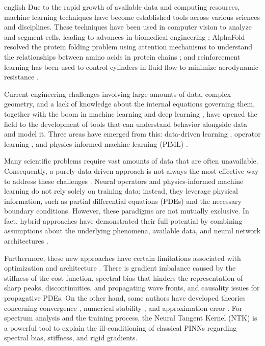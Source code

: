 \documentclass[0000.tex]{subfiles}
\begin{document}
\begin{hyphenrules}{english}
Due to the rapid growth of available data and computing resources, machine learning techniques have
become established tools across various sciences and disciplines. These techniques have been used in
computer vision to analyze and segment cells, leading to advances in biomedical engineering
\cite{ronneberger2015}; AlphaFold resolved the protein folding problem using attention mechanisms
to understand the relationships between amino acids in protein chains \cite{jumper2021}; and
reinforcement learning has been used to control cylinders in fluid flow to minimize aerodynamic
resistance \cite{rabault2019}.

Current engineering challenges involving large amounts of data, complex geometry, and a lack of
knowledge about the internal equations governing them, together with the boom in machine learning and
deep learning \cite{bishop2006,goodfellow2016,bach2024}, have opened the field to the development
of tools that can understand behavior alongside data and model it. Three areas have emerged from this:
data-driven learning \cite{fiorini2025,brunton2016,chen2018}, operator learning
\cite{kovachki2021,li2021fno}, and physics-informed machine learning (PIML)
\cite{raissi2019,cuomo2022}.

Many scientific problems require vast amounts of data that are often unavailable. Consequently, a
purely data-driven approach is not always the most effective way to address these challenges
\cite{wu2020}. Neural operators and physics-informed machine learning do not rely solely on
training data; instead, they leverage physical information, such as partial differential equations
(PDEs) and the necessary boundary conditions. However, these paradigms are not mutually exclusive. In
fact, hybrid approaches have demonstrated their full potential by combining assumptions about the
underlying phenomena, available data, and neural network architectures
\cite{raissi2020hidden,kissas2020,nguyen2022}.

Furthermore, these new approaches have certain limitations associated with optimization \cite{wang2021gradient,wang2022ntk,krishnapriyan2021,deshpande2022,nguyen2023} and architecture \cite{rahaman2019,cao2020spectral,wang2021deeponet}. There is gradient imbalance caused by the stiffness of the cost function, spectral bias that hinders the representation of sharp peaks, discontinuities, and propagating wave fronts, and causality issues for propagative PDEs. On the other
hand, some authors have developed theories concerning convergence
\cite{mishra2025,siegel2024,shin2020convergence}, numerical stability
\cite{deryck2024acta,dong2024}, and approximation error \cite{zeinhofer2024,chantada2024}.
For spectrum analysis and the training process, the Neural Tangent Kernel (NTK) is a powerful tool to
explain the ill-conditioning of classical PINNs \cite{jacot2018,wang2022ntk} regarding spectral
bias, stiffness, and rigid gradients.


\end{hyphenrules}
\end{document}
